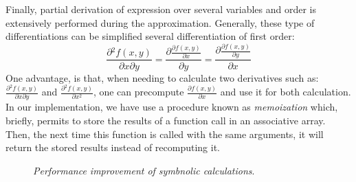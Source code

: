 Finally, partial derivation of expression over several variables and order is extensively performed during the approximation.
Generally, these type of differentiations can be simplified several differentiation of first order:
\begin{equation}
\frac{\partial{} ^ 2 f(x,y)}{\partial x \partial y}  =
\frac{\partial{} \frac{\partial{} f(x,y)}{\partial x}}{\partial y} =
\frac{\partial{} \frac{\partial{} f(x,y)}{\partial{} y}}{\partial{} x}
\end{equation}
One advantage, is that, when needing to calculate two derivatives such as:  $\frac{\partial{} ^ 2 f(x,y)}{\partial{} x \partial{} y}$ and $\frac{\partial{} ^ 2 f(x,y)}{\partial{} x^2}$, 
one can precompute $\frac{\partial{} f(x,y)}{\partial{} x}$ and use it for both calculation.
In our implementation, we have use a procedure known as \emph{memoization} which, briefly, permits to store the results of a function call in an associative array.
Then, the next time this function is called with the same arguments, it will return the stored results instead of recomputing it.



\begin{figure}
\caption{\emph{Performance improvement of symbnolic calculations}.
~}

\label{fig:mea_benchmark}
\end{figure}
